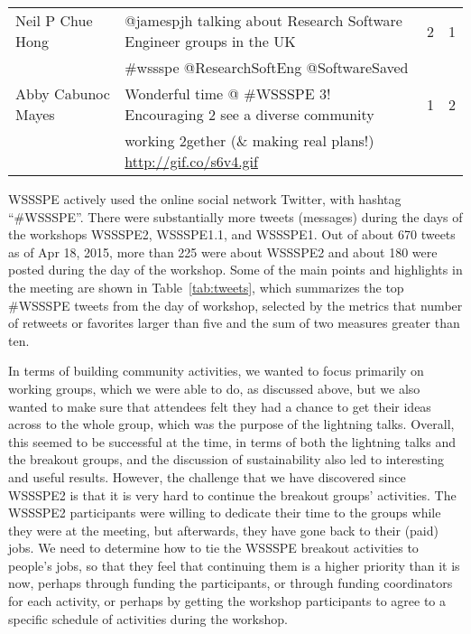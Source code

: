 \documentclass[11pt, oneside]{amsart}
\begin{document}
\begin{table*}[t]
\begin{scriptsize}
\begin{tabular}{@{}l l l l@{}}
%
\\ Neil P Chue Hong & @jamespjh talking about Research Software Engineer groups in the UK & 2 & 1
\\ &  \#wssspe @ResearchSoftEng @SoftwareSaved & & 
%
\\ Abby Cabunoc Mayes & Wonderful time @ \#WSSSPE 3! Encouraging 2 see a diverse community & 1 & 2 
\\ & working 2gether (\& making real plans!) \url{http://gif.co/s6v4.gif} & & 
%
\\ \bottomrule
    \end{tabular}
    \end{scriptsize}
\end{table*}

WSSSPE actively used the online social network Twitter, with hashtag
``\#WSSSPE''. There were substantially more tweets (messages) during the days of
the workshops WSSSPE2, WSSSPE1.1, and WSSSPE1. Out of about 670 tweets as of Apr
18, 2015, more than 225 were about WSSSPE2 and about 180 were posted during the
day of the workshop. Some of the main points and highlights in the meeting are
shown in Table~\ref{tab:tweets}, which summarizes the top \#WSSSPE tweets from
the day of workshop, selected by the metrics that number of retweets or
favorites larger than five and the sum of two measures greater than ten.

In terms of building community activities, we wanted to focus primarily on
working groups, which we were able to do, as discussed above, but we
also wanted to make sure that attendees felt they had a chance to get their
ideas across to the whole group, which was the purpose of the lightning talks.
Overall, this seemed to be successful at the time, in terms of both the lightning
talks and the breakout groups, and the discussion of sustainability also led
to interesting and useful results. However, the challenge that we have discovered
since WSSSPE2 is that it is very hard to continue the breakout groups'
activities.  The WSSSPE2 participants were willing to dedicate their time to
the groups while they were at the meeting, but afterwards, they have gone
back to their (paid) jobs.  We need to determine how to tie the WSSSPE
breakout activities to people's jobs, so that they feel that continuing them
is a higher priority than it is now, perhaps through funding the participants,
or through funding coordinators for each activity, or perhaps by getting
the workshop participants to agree to a specific schedule of activities during the
workshop.
\end{document}
